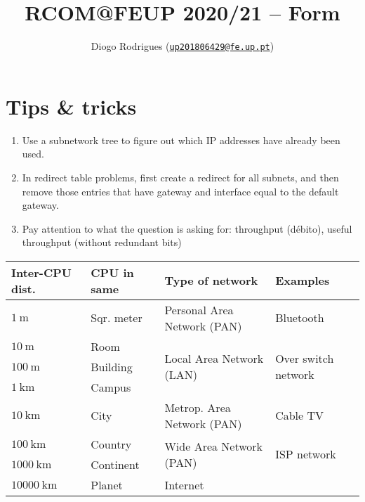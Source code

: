 \documentclass{form}
\author{Diogo Rodrigues (\texttt{\href{mailto:up201806429@fe.up.pt}{up201806429@fe.up.pt}})}
\title{RCOM@FEUP 2020/21 -- Form}
\begin{document}

\maketitle

\begin{minipage}{0.425\textwidth}
    \section*{Tips \& tricks}
    \begin{enumerate}
        \setlength\itemsep{-0.2em}
        \item Use a subnetwork tree to figure out which IP addresses have already been used.
        \item In redirect table problems, first create a redirect for all subnets, and then remove those entries that have gateway and interface equal to the default gateway.
        \item Pay attention to what the question is asking for: throughput (débito), useful throughput (without redundant bits)
    \end{enumerate}
\end{minipage}
\begin{minipage}{38em}
    \begin{tabular}{@{}l | l | l | p{5.4em}@{}}
        \textbf{Inter-CPU dist.} & \textbf{CPU in same} & \textbf{Type of network} & \textbf{Examples} \\ \hline
        $\SI{    1}{     \meter}$ & Sqr. meter   & Personal Area Network (PAN)               & Bluetooth \\ \hline
        $\SI{   10}{     \meter}$ & Room         & \multirow{3}{*}{Local Area Network (LAN)} & \multirow{3}{5.4em}{Over switch network} \\ \cline{1-2}
        $\SI{  100}{     \meter}$ & Building     &                                           & \\ \cline{1-2}
        $\SI{    1}{\kilo\meter}$ & Campus       &                                           & \\ \hline
        $\SI{   10}{\kilo\meter}$ & City         & Metrop. Area Network (PAN)                & Cable TV \\ \hline
        $\SI{  100}{\kilo\meter}$ & Country      & \multirow{2}{*}{Wide Area Network (PAN)}  & \multirow{2}{5.4em}{ISP network} \\ \cline{1-2}
        $\SI{ 1000}{\kilo\meter}$ & Continent    &                                           & \\ \hline
        $\SI{10000}{\kilo\meter}$ & Planet       & Internet                                  & \\
    \end{tabular}
\end{minipage}
\end{document}
